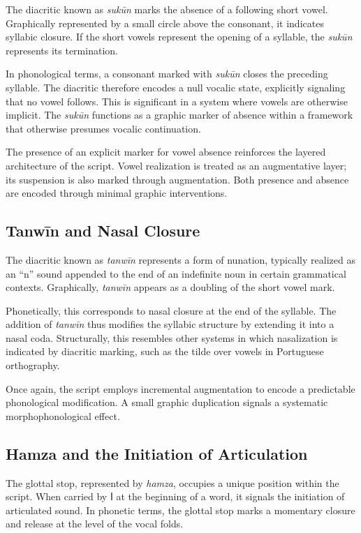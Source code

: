 \documentclass[11pt]{article}
\begin{document}
The diacritic known as \textit{sukūn} marks the absence of a following short vowel. Graphically represented by a small circle above the consonant, it indicates syllabic closure. If the short vowels represent the opening of a syllable, the \textit{sukūn} represents its termination.

In phonological terms, a consonant marked with \textit{sukūn} closes the preceding syllable. The diacritic therefore encodes a null vocalic state, explicitly signaling that no vowel follows. This is significant in a system where vowels are otherwise implicit. The \textit{sukūn} functions as a graphic marker of absence within a framework that otherwise presumes vocalic continuation.

The presence of an explicit marker for vowel absence reinforces the layered architecture of the script. Vowel realization is treated as an augmentative layer; its suspension is also marked through augmentation. Both presence and absence are encoded through minimal graphic interventions.

\subsection{Tanwīn and Nasal Closure}

The diacritic known as \textit{tanwīn} represents a form of nunation, typically realized as an ``n'' sound appended to the end of an indefinite noun in certain grammatical contexts. Graphically, \textit{tanwīn} appears as a doubling of the short vowel mark.

Phonetically, this corresponds to nasal closure at the end of the syllable. The addition of \textit{tanwīn} thus modifies the syllabic structure by extending it into a nasal coda. Structurally, this resembles other systems in which nasalization is indicated by diacritic marking, such as the tilde over vowels in Portuguese orthography.

Once again, the script employs incremental augmentation to encode a predictable phonological modification. A small graphic duplication signals a systematic morphophonological effect.

\subsection{Hamza and the Initiation of Articulation}

The glottal stop, represented by \textit{hamza}, occupies a unique position within the script. When carried by \textarabic{ا} at the beginning of a word, it signals the initiation of articulated sound. In phonetic terms, the glottal stop marks a momentary closure and release at the level of the vocal folds.
\end{document}
